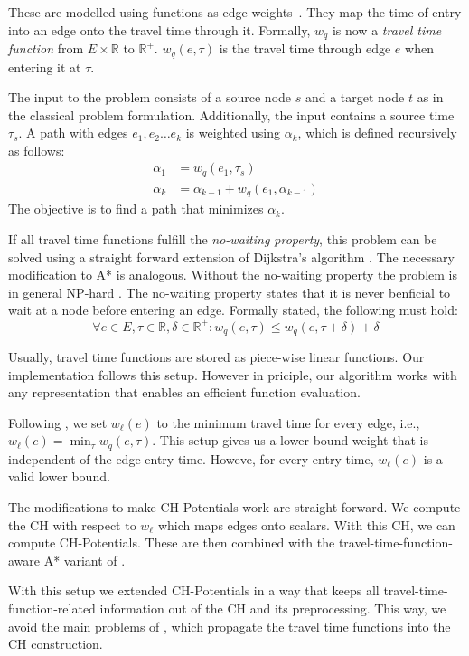 \documentclass[sigconf]{acmart}
\begin{document}
These are modelled using functions as edge weights~\cite{lots-of-td-papers}.
They map the time of entry into an edge onto the travel time through it.
Formally, $w_q$ is now a \emph{travel time function} from $E\times \mathbb{R}$ to $\mathbb{R}^+$. 
$w_q(e, \tau)$ is the travel time through edge $e$ when entering it at $\tau$.

The input to the problem consists of a source node $s$ and a target node $t$ as in the classical problem formulation.
Additionally, the input contains a source time $\tau_s$.
A path with edges $e_1,e_2\ldots e_k$ is weighted using $\alpha_k$, which is defined recursively as follows:\[
\begin{split}
\alpha_{1} & = w_q(e_1, \tau_s) \\
\alpha_{k} & = \alpha_{k-1} + w_q(e_1, \alpha_{k-1})
\end{split}
\]
The objective is to find a path that minimizes $\alpha_k$.

If all travel time functions fulfill the \emph{no-waiting property}, this problem can be solved using a straight forward extension of Dijkstra's algorithm \cite{td-alt?}.
The necessary modification to A* is analogous.
Without the no-waiting property the problem is in general NP-hard \cite{veit}.
The no-waiting property states that it is never benficial to wait at a node before entering an edge.
Formally stated, the following must hold:\[
\forall e\in E,\tau\in \mathbb{R},\delta\in \mathbb{R}^+: w_q(e, \tau) \le w_q(e, \tau+\delta) + \delta
\]

Usually, travel time functions are stored as piece-wise linear functions.
Our implementation follows this setup.
However in priciple, our algorithm works with any representation that enables an efficient function evaluation.

Following \cite{td-alt}, we set $w_\ell(e)$ to the minimum travel time for every edge, i.e., $w_\ell(e) = \min_\tau w_q(e,\tau)$.
This setup gives us a lower bound weight that is independent of the edge entry time. 
Howeve, for every entry time, $w_\ell(e)$ is a valid lower bound.

The modifications to make CH-Potentials work are straight forward.
We compute the CH with respect to $w_\ell$ which maps edges onto scalars.
With this CH, we can compute CH-Potentials.
These are then combined with the travel-time-function-aware A* variant of \cite{td-alt?}. 

With this setup we extended CH-Potentials in a way that keeps all travel-time-function-related information out of the CH and its preprocessing.
This way, we avoid the main problems of \cite{tdch,catchup}, which propagate the travel time functions into the CH construction.
\end{document}
